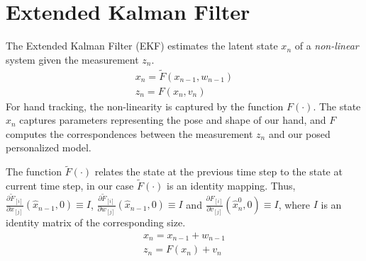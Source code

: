\section{Extended Kalman Filter}
The Extended Kalman Filter (EKF) estimates the latent state $x_n$ of a \emph{non-linear} system given the measurement $z_n$.
% 
\begin{align}
x_n = \tilde{F}(x_{n - 1},  w_{n - 1}) \\
z_n = F(x_n, v_n)
\end{align}
% 
For hand tracking, the non-linearity is captured by the function $F(\cdot)$. The state $x_n$ captures parameters representing the pose and shape of our hand, and $F$ computes the correspondences between the measurement $z_n$ and 
our posed personalized model.
% 

The function $\tilde{F}(\cdot)$ relates the state at the previous time step to the state at current time step, in our case $\tilde{F}(\cdot)$ is an identity mapping. Thus, $\frac{ \partial \tilde{F}_{[i]}}{ \partial x_{[j]}}(\hat{x}_{n - 1}, 0) \equiv I$, 
$\frac{ \partial \tilde{F}_{[i]}}{ \partial w_{[j]}}(\hat{x}_{n - 1}, 0) \equiv I$ and $\frac{ \partial F_{[i]}}{ \partial v_{[j]}}(\hat{x}_n^0, 0) \equiv I$, where $I$ is an identity matrix of the corresponding size.
\begin{align}
x_n = x_{n - 1} + w_{n - 1} \\
z_n = F(x_n) + v_n 
\end{align}



\begin{table}[t] 
\centering
{}
\caption{Extended Kalman Filter (with $\tilde{F}(\cdot)$ identity)}
\end{table}

